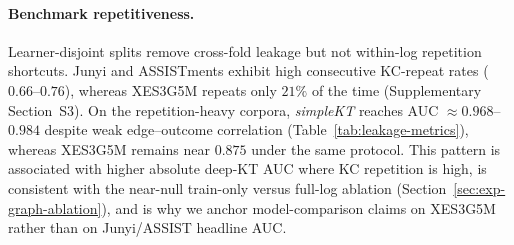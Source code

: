 \documentclass[preprint,10pt,doubleblind]{elsarticle}
\begin{document}
\paragraph{Benchmark repetitiveness.}
\label{sec:exp-autocorr}
Learner-disjoint splits remove cross-fold leakage but not within-log
repetition shortcuts. Junyi and ASSISTments exhibit high consecutive
KC-repeat rates ($0.66$--$0.76$), whereas XES3G5M repeats only $21\%$ of the
time (Supplementary Section~S3). On the repetition-heavy corpora,
\textit{simpleKT} reaches AUC ${\approx}0.968$--$0.984$ despite weak
edge--outcome correlation (Table~\ref{tab:leakage-metrics}), whereas XES3G5M
remains near $0.875$ under the same protocol. This pattern is associated with
higher absolute deep-KT AUC where KC repetition is high, is consistent with
the near-null train-only versus full-log ablation
(Section~\ref{sec:exp-graph-ablation}), and is why we anchor model-comparison
claims on XES3G5M rather than on Junyi/ASSIST headline AUC.
\end{document}
